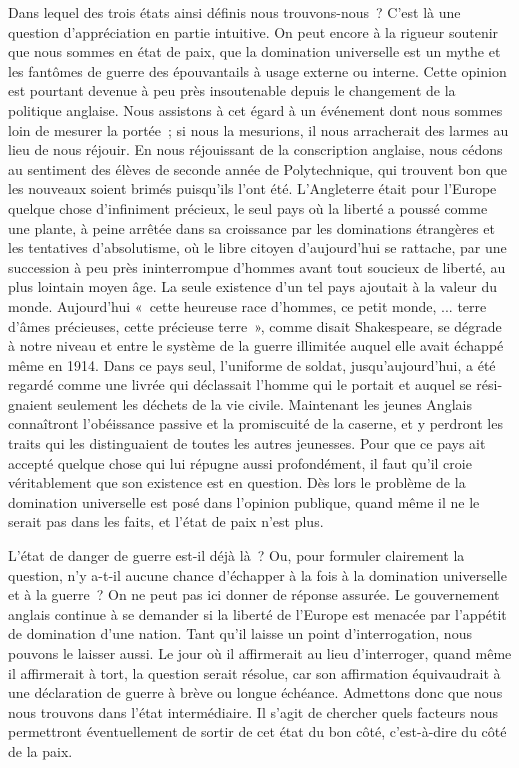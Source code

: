 \documentclass[french,twoside]{book} %
\begin{document}
Dans lequel des trois états ainsi définis nous trouvons-nous ? C'est là une question d'appréciation en partie intuitive. On peut encore à la rigueur soutenir que nous sommes en état de paix, que la domination universelle est un mythe et les fantômes de guerre des épouvantails à usage externe ou interne. Cette opinion est pourtant devenue à peu près insoutenable depuis le changement de la politique anglaise. Nous assistons à cet égard à un événement dont nous sommes loin de mesurer la portée ; si nous la mesurions, il nous arracherait des larmes au lieu de nous réjouir. En nous réjouissant de la conscription anglaise, nous cédons au sentiment des élèves de seconde année de Polytech­nique, qui trouvent bon que les nouveaux soient brimés puisqu'ils l'ont été. L'Angleterre était pour l'Europe quelque chose d'infiniment précieux, le seul pays où la liberté a poussé comme une plante, à peine arrêtée dans sa crois­sance par les dominations étrangères et les tentatives d'absolutisme, où le libre citoyen d'aujourd'hui se rattache, par une succession à peu près ininter­rompue d'hommes avant tout soucieux de liberté, au plus lointain moyen âge. La seule existence d'un tel pays ajoutait à la valeur du monde. Aujourd'hui « cette heureuse race d'hommes, ce petit monde, ... terre d'âmes précieuses, cette précieuse terre », comme disait Shakespeare, se dégrade à notre niveau et entre le système de la guerre illimitée auquel elle avait échappé même en 1914. Dans ce pays seul, l’uniforme de soldat, jusqu'aujourd'hui, a été regardé comme une livrée qui déclassait l'homme qui le portait et auquel se rési­gnaient seulement les déchets de la vie civile. Maintenant les jeunes Anglais connaîtront l'obéissance passive et la promiscuité de la caserne, et y perdront les traits qui les distinguaient de toutes les autres jeunesses. Pour que ce pays ait accepté quelque chose qui lui répugne aussi profondément, il faut qu'il croie véritablement que son existence est en question. Dès lors le problème de la domination universelle est posé dans l'opinion publique, quand même il ne le serait pas dans les faits, et l'état de paix n'est plus.\par
L'état de danger de guerre est-il déjà là ? Ou, pour formuler clairement la question, n'y a-t-il aucune chance d'échapper à la fois à la domination universelle et à la guerre ? On ne peut pas ici donner de réponse assurée. Le gouvernement anglais continue à se demander si la liberté de l'Europe est menacée par l'appétit de domination d'une nation. Tant qu'il laisse un point d'interrogation, nous pouvons le laisser aussi. Le jour où il affirmerait au lieu d'interroger, quand même il affirmerait à tort, la question serait résolue, car son affirmation équivaudrait à une déclaration de guerre à brève ou longue échéance. Admettons donc que nous nous trouvons dans l'état intermédiaire. Il s'agit de chercher quels facteurs nous permettront éventuellement de sortir de cet état du bon côté, c'est-à-dire du côté de la paix.\par
\end{document}
